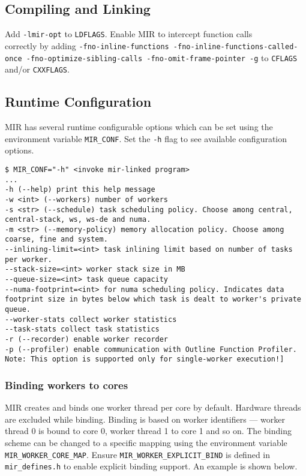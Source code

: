 \documentclass[11pt,a4paper]{article}
\begin{document}
\subsection{Compiling and Linking}\label{compiling-and-linking}

Add \texttt{-lmir-opt} to \texttt{LDFLAGS}. Enable MIR to intercept function calls\\correctly by adding \texttt{{\footnotesize -fno-inline-functions -fno-inline-functions-called-once -fno-optimize-sibling-calls -fno-omit-frame-pointer -g}}  to \texttt{CFLAGS} and/or \texttt{CXXFLAGS}.

\subsection{Runtime Configuration}\label{runtime-configuration}

MIR has several runtime configurable options which can be set using the environment variable \texttt{MIR\_CONF}. Set the \texttt{-h} flag to see available configuration options.

\begin{lstlisting}[style=MyInputStyle]
$ MIR_CONF="-h" <invoke mir-linked program>
...
-h (--help) print this help message
-w <int> (--workers) number of workers
-s <str> (--schedule) task scheduling policy. Choose among central, central-stack, ws, ws-de and numa.
-m <str> (--memory-policy) memory allocation policy. Choose among coarse, fine and system.
--inlining-limit=<int> task inlining limit based on number of tasks per worker.
--stack-size=<int> worker stack size in MB
--queue-size=<int> task queue capacity
--numa-footprint=<int> for numa scheduling policy. Indicates data footprint size in bytes below which task is dealt to worker's private queue.
--worker-stats collect worker statistics
--task-stats collect task statistics
-r (--recorder) enable worker recorder
-p (--profiler) enable communication with Outline Function Profiler. Note: This option is supported only for single-worker execution!]
\end{lstlisting}

\subsubsection{Binding workers to cores}\label{binding-workers-to-cores}

MIR creates and binds one worker thread per core by default. Hardware threads are excluded while binding. Binding is based on worker identifiers --- worker thread 0 is bound to core 0, worker thread 1 to core 1 and so on. The binding scheme can be changed to a specific mapping using the environment variable \texttt{MIR\_WORKER\_CORE\_MAP}. Ensure \texttt{MIR\_WORKER\_EXPLICIT\_BIND} is defined in \texttt{mir\_defines.h} to enable explicit binding support. An example is shown below.
\end{document}
